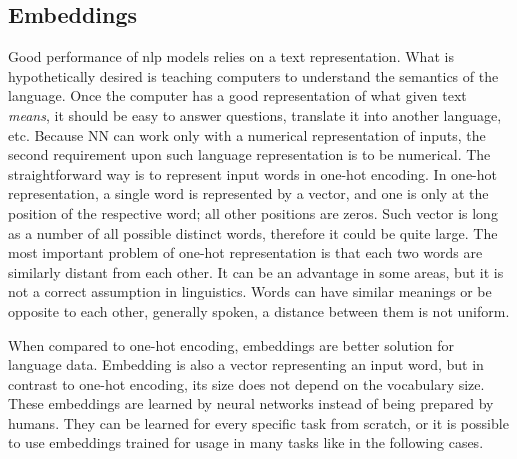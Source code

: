 \subsection{Embeddings}
\label{sec:embedd}
Good performance of \acrshort{nlp} models relies on a text representation. What is hypothetically desired is teaching computers to understand the semantics of the language. Once the computer has a good representation of what given text \textit{means}, it should be easy to answer questions, translate it into another language, etc. Because NN can work only with a numerical representation of inputs, the second requirement upon such language representation is to be numerical. The straightforward way is to represent input words in one-hot encoding. In one-hot representation, a single word is represented by a vector, and one is only at the position of the respective word; all other positions are zeros. Such vector is long as a number of all possible distinct words, therefore it could be quite large. The most important problem of one-hot representation is that each two words are similarly distant from each other. It can be an advantage in some areas, but it is not a correct assumption in linguistics. Words can have similar meanings or be opposite to each other, generally spoken, a distance between them is not uniform.
\par
When compared to one-hot encoding, embeddings  \citep{Bengio2003, Ling} are better solution for language data. Embedding is also a vector representing an input word, but in contrast to one-hot encoding, its size does not depend on the vocabulary size. These embeddings are learned by neural networks instead of being prepared by humans. They can be learned for every specific task from scratch, or it is possible to use embeddings trained for usage in many tasks like in the following cases.

